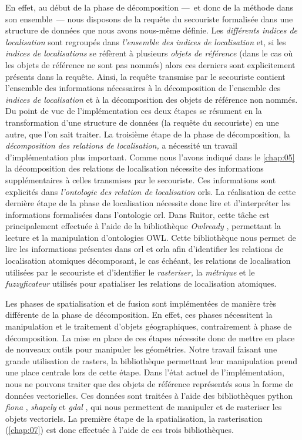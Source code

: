 En effet, au début de la phase de décomposition ---~et donc de la
méthode dans son ensemble~--- nous disposons de la requête du
secouriste formalisée dans une structure de données que nous avons
nous-même définie. Les \emph{différents indices de localisation} sont
regroupés dans \emph{l'ensemble des indices de localisation} et, si
les \emph{indices de localisations} se réfèrent à plusieurs
\emph{objets de référence} (\ie dans le cas où les objets de référence
ne sont pas nommés) alors ces derniers sont explicitement présents
dans la requête. Ainsi, la requête transmise par le secouriste
contient l'ensemble des informations nécessaires à la décomposition de
l'ensemble des \emph{indices de localisation} et à la décomposition
des objets de référence non nommés. Du point de vue de
l'implémentation ces deux étapes se résument en la transformation
d'une structure de données (la requête du secouriste) en une autre,
que l'on sait traiter. La troisième étape de la phase de
décomposition, la \emph{décomposition des relations de localisation,}
a nécessité un travail d'implémentation plus important. Comme nous
l'avons indiqué dans le \autoref{chap:05} la décomposition des
relations de localisation nécessite des informations supplémentaires à
celles transmises par le secouriste. Ces informations sont explicités
dans \emph{l'ontologie des relation de localisation} \acp{orl}. La
réalisation de cette dernière étape de la phase de localisation
nécessite donc lire et d'interpréter les informations formalisées dans
l'ontologie \ac{orl}. Dans Ruitor, cette tâche est principalement
effectuée à l'aide de la bibliothèque \emph{Owlready}
\autocite{Lamy2017}, permettant la lecture et la manipulation
d'ontologies OWL. Cette bibliothèque nous permet de lire les
informations présentes dans \ac{orl} et \ac{orla} afin d'identifier
les relations de localisation atomiques décomposant, le cas échéant,
les relations de localisation utilisées par le secouriste et
d'identifier le \emph{rasteriser,} la \emph{métrique} et le
\emph{fuzzyficateur} utilisés pour spatialiser les relations de
localisation atomiques.

Les phases de spatialisation et de fusion sont implémentées de manière
très différente de la phase de décomposition. En effet, ces phases
nécessitent la manipulation et le traitement d'objets géographiques,
contrairement à phase de décomposition. La mise en place de ces étapes
nécessite donc de mettre en place de nouveaux outils pour manipuler
les géométries. Notre travail faisant une grande utilisation de
rasters, la bibliothèque permettant leur manipulation prend une place
centrale lors de cette étape. Dans l'état actuel de l'implémentation,
nous ne pouvons traiter que des objets de référence représentés sous
la forme de données vectorielles. Ces données sont traitées à l'aide
des bibliothèques python \emph{fiona} \autocite{Gillies2020a},
\emph{shapely} \autocite{Gillies2020} et \emph{gdal}
\autocite{GDAL2020}, qui nous permettent de manipuler et de rasteriser
les objets vectoriels. La première étape de la spatialisation, la
rasterisation (\autoref{chap:07}) est donc effectuée à l'aide de ces
trois bibliothèques.

